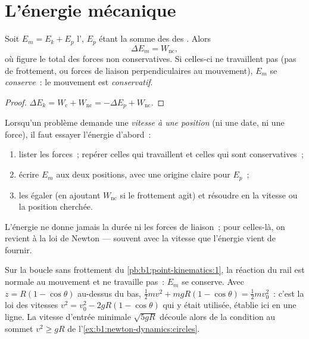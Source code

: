 \section{L'énergie mécanique}

\begin{theorem}\label{thm:b1:work-and-energy:em}
Soit $E_m = E_k + E_p$ l'\emph{}, $E_p$ étant la somme
des  des . Alors
\[
\Delta E_m = W_{\text{nc}} ,
\]
où figure le  total des forces non conservatives. Si celles-ci ne
travaillent pas (pas de frottement, ou forces de liaison
perpendiculaires au mouvement), $E_m$ se \emph{conserve}~: le mouvement
est \emph{conservatif}.
\end{theorem}

\begin{proof}
$\Delta E_k = W_{\text{c}} + W_{\text{nc}} = -\Delta E_p + W_{\text{nc}}$.
\end{proof}

\begin{method}\label{met:b1:work-and-energy:method}
Lorsqu'un problème demande une \emph{vitesse à une position} (ni une
date, ni une force), il faut essayer l'énergie d'abord~:
\begin{enumerate}
  \item lister les forces~; repérer celles qui travaillent et celles qui
        sont conservatives~;
  \item écrire $E_m$ aux deux positions, avec une origine claire pour $E_p$~;
  \item les égaler (en ajoutant $W_{\text{nc}}$ si le frottement agit) et
        résoudre en la vitesse ou la position cherchée.
\end{enumerate}
L'énergie ne donne jamais la durée ni les forces de liaison~; pour
celles-là, on revient à la loi de Newton --- souvent avec la vitesse que
l'énergie vient de fournir.
\end{method}

\begin{example}\label{ex:b1:work-and-energy:loop}
Sur la boucle sans frottement du \cref{pb:b1:point-kinematics:1}, la
réaction du rail est normale au mouvement et ne travaille pas~: $E_m$
se conserve. Avec $z = R(1 - \cos\theta)$ au-dessus du bas, $\tfrac12 mv^2 + mgR(1 -
\cos\theta) = \tfrac12 mv_0^2$~: c'est la loi des vitesses $v^2 = v_0^2 - 2gR(1 -
\cos\theta)$ qui y était utilisée, établie ici en une ligne. La vitesse
d'entrée minimale $\sqrt{5gR}$ découle alors de la condition au sommet
$v^2 \geq gR$ de l'\cref{ex:b1:newton-dynamics:circles}.
\end{example}

